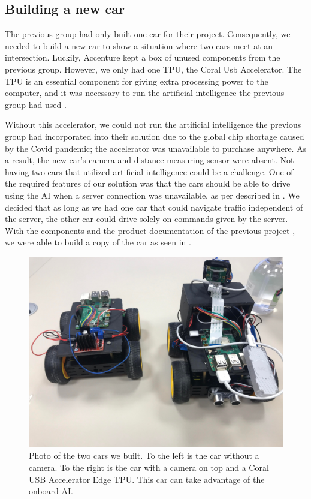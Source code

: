 \subsection{Building a new car}
The previous group had only built one car for their project. Consequently, we needed to build a new car to show a situation where two cars meet at an intersection. Luckily, Accenture kept a box of unused components from the previous group. However, we only had one TPU, the Coral Usb Accelerator. The TPU is an essential component for giving extra processing power to the computer, and it was necessary to run the artificial intelligence the previous group had used \parencite{prev_project}. 

Without this accelerator, we could not run the artificial intelligence the previous group had incorporated into their solution due to the global chip shortage caused by the Covid pandemic; the accelerator was unavailable to purchase anywhere. As a result, the new car's camera and distance measuring sensor were absent. Not having two cars that utilized artificial intelligence could be a challenge. One of the required features of our solution was that the cars should be able to drive using the AI when a server connection was unavailable, as per described in . We decided that as long as we had one car that could navigate traffic independent of the server, the other car could drive solely on commands given by the server. With the components and the product documentation of the previous project , we were able to build a copy of the car as seen in .

\begin{figure}[h!]
	\centering
	\includegraphics[width=0.9\linewidth]{figures/two_cars}
	\caption{Photo of the two cars we built. To the left is the car without a camera. To the right is the car with a camera on top and a Coral USB Accelerator Edge TPU. This car can take advantage of the onboard AI.}
	\label{fig:twocars}
\end{figure}



